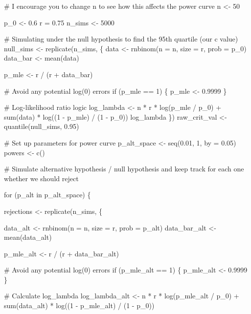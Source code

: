 \documentclass[
  letterpaper,
  DIV=11,
  numbers=noendperiod]{scrreprt}
\newenvironment{Shaded}{\begin{snugshade}}{\end{snugshade}}
\newcommand{\NormalTok}[1]{\textcolor[rgb]{0.00,0.23,0.31}{#1}}
\begin{document}
\begin{Shaded}
\begin{Highlighting}[]
\NormalTok{\# I encourage you to change n to see how this affects the power curve}
\NormalTok{n \textless{}{-} 50}

\NormalTok{p\_0 \textless{}{-} 0.6}
\NormalTok{r = 0.75}
\NormalTok{n\_sims \textless{}{-} 5000  }

\NormalTok{\# Simulating under the null hypothesis to find the 95th quartile (our c value)}
\NormalTok{null\_sims \textless{}{-} replicate(n\_sims, \{}
\NormalTok{  data \textless{}{-} rnbinom(n = n, size = r, prob = p\_0)}
\NormalTok{  data\_bar \textless{}{-} mean(data)}
  
\NormalTok{  p\_mle \textless{}{-} r / (r + data\_bar)}
  
\NormalTok{  \# Avoid any potential log(0) errors}
\NormalTok{  if (p\_mle == 1) \{ }
\NormalTok{    p\_mle \textless{}{-} 0.9999 }
\NormalTok{  \}}
  
\NormalTok{  \# Log{-}likelihood ratio logic}
\NormalTok{  log\_lambda \textless{}{-} n * r * log(p\_mle / p\_0) + sum(data) * log((1 {-} p\_mle) / (1 {-} p\_0))}
\NormalTok{  log\_lambda}
\NormalTok{\})}
\NormalTok{raw\_crit\_val \textless{}{-} quantile(null\_sims, 0.95)}

\NormalTok{\# Set up parameters for power curve}
\NormalTok{p\_alt\_space \textless{}{-} seq(0.01, 1, by = 0.05)}
\NormalTok{powers \textless{}{-} c()  }

\NormalTok{\# Simulate alternative hypothesis / null hypothesis and keep track for each one whether we should reject}

\NormalTok{for (p\_alt in p\_alt\_space) \{}
  
\NormalTok{  rejections \textless{}{-} replicate(n\_sims, \{}

\NormalTok{    data\_alt \textless{}{-} rnbinom(n = n, size = r, prob = p\_alt)}
\NormalTok{    data\_bar\_alt \textless{}{-} mean(data\_alt)}
    
\NormalTok{    p\_mle\_alt \textless{}{-} r / (r + data\_bar\_alt)}
    
\NormalTok{    \# Avoid any potential log(0) errors}
\NormalTok{    if (p\_mle\_alt == 1) \{ }
\NormalTok{      p\_mle\_alt \textless{}{-} 0.9999 }
\NormalTok{    \}}
    
\NormalTok{    \# Calculate log\_lambda}
\NormalTok{    log\_lambda\_alt \textless{}{-} n * r * log(p\_mle\_alt / p\_0) + sum(data\_alt) * log((1 {-} p\_mle\_alt) / (1 {-} p\_0))}
    

\end{Highlighting}
\end{Shaded}
\end{document}
